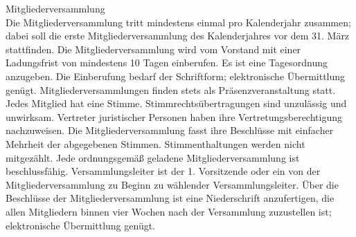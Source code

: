 \documentclass[fontsize=11pt,pagesize,parskip=half]{scrartcl}
\begin{document}
\begin{contract}
Mitgliederversammlung\\
Die Mitgliederversammlung tritt mindestens einmal pro Kalenderjahr zusammen; dabei soll die erste Mitgliederversammlung des Kalenderjahres vor dem 31. März stattfinden.
Die Mitgliederversammlung wird vom Vorstand mit einer Ladungsfrist von mindestens 10 Tagen einberufen.
Es ist eine Tagesordnung anzugeben.
Die Einberufung bedarf der Schriftform; elektronische Übermittlung genügt.
Mitgliederversammlungen finden stets als Präsenzveranstaltung statt.
Jedes Mitglied hat eine Stimme.
Stimmrechtsübertragungen sind unzulässig und unwirksam.
Vertreter juristischer Personen haben ihre Vertretungsberechtigung nachzuweisen.
Die Mitgliederversammlung fasst ihre Beschlüsse mit einfacher Mehrheit der abgegebenen Stimmen.
Stimmenthaltungen werden nicht mitgezählt.
Jede ordnungsgemäß geladene Mitgliederversammlung ist beschlussfähig.
Versammlungsleiter ist der 1. Vorsitzende oder ein von der Mitgliederversammlung zu Beginn zu wählender Versammlungsleiter.
Über die Beschlüsse der Mitgliederversammlung ist eine Niederschrift anzufertigen, die allen Mitgliedern binnen vier Wochen nach der Versammlung zuzustellen ist; elektronische Übermittlung genügt.


\end{contract}
\end{document}
